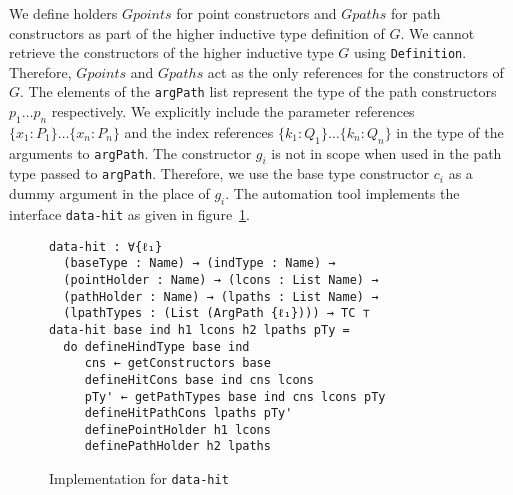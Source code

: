 \documentclass[sigplan,10pt]{acmart}
\begin{document}
We define holders $Gpoints$ for point constructors and $Gpaths$ for path constructors as part of the higher inductive type definition of $G$. We cannot retrieve the constructors of the higher inductive type $G$ using {\tt Definition}. Therefore, $Gpoints$ and $Gpaths$ act as the only references for the constructors of $G$. The elements of the {\tt argPath} list represent the type of the path constructors $p_1 \ldots p_n$ respectively. We explicitly include the parameter references $\{x_1 : P_1\} \ldots \{x_n : P_n\}$ and the index references $\{k_1 : Q_1\} \ldots \{k_n : Q_n\}$ in the type of the arguments to {\tt argPath}. The constructor $g_i$ is not in scope when used in the path type passed to {\tt argPath}. Therefore, we use the base type constructor $c_i$ as a dummy argument in the place of $g_i$. The automation tool implements the interface {\tt data-hit} as given in figure~\ref{fig:data-hit}.

\begin{figure}
\begin{center}
\begingroup
\fontsize{7pt}{9pt}\selectfont
\begin{Verbatim}
data-hit : ∀{ℓ₁} 
  (baseType : Name) → (indType : Name) →
  (pointHolder : Name) → (lcons : List Name) →
  (pathHolder : Name) → (lpaths : List Name) →
  (lpathTypes : (List (ArgPath {ℓ₁}))) → TC ⊤
data-hit base ind h1 lcons h2 lpaths pTy =
  do defineHindType base ind
     cns ← getConstructors base
     defineHitCons base ind cns lcons
     pTy' ← getPathTypes base ind cns lcons pTy
     defineHitPathCons lpaths pTy'
     definePointHolder h1 lcons
     definePathHolder h2 lpaths
\end{Verbatim}
\endgroup
\end{center}
\caption{Implementation for {\tt data-hit}}
\label{fig:data-hit}
\end{figure}
\normalsize

\end{document}
